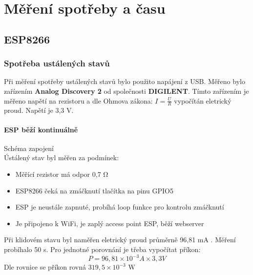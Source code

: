 \documentclass[a4paper, 12pt]{report}
\begin{document}
	\chapter{Měření spotřeby a času}
		\section{ESP8266}

			\subsection{Spotřeba ustálených stavů}
				Při měření spotřeby ustálených stavů bylo použito napájení z USB. Měřeno bylo zařízením \textbf{Analog Discovery 2} od společnosti \textbf{DIGILENT}. Tímto zařízením je měřeno napětí na rezistoru a dle Ohmova zákona: $I =\frac{U}{R}$ vypočítán eletrický proud. Napětí je 3,3 V.

				\subsubsection{ESP běží kontinuálně}
					Schéma zapojení  \\
					Ústálený stav byl měřen za podmínek:
					\begin{itemize}
						\item Měřící rezistor má odpor 0,7 \si{\ohm}
						\item ESP8266 čeká na zmáčknutí tlačítka na pinu GPIO5
						\item ESP je neustále zapnuté, probíhá loop funkce pro kontrolu zmáčknutí
						\item Je připojeno k WiFi, je zaplý access point ESP, běží webserver
					\end{itemize}
		 			Při klidovém stavu byl naměřen eletrický proud průměrně 96,81 \si{mA} . Měření probíhalo 50 \si{s}. Pro jednotné porovnání je třeba vypočítat příkon:
						$$P = 96,81 \times 10^{-3}\si{A} \times 3,3 \si{ V}$$
		 			Dle rovnice se příkon rovná $ 319,5 \times 10^{-3}$ \si{\watt}\\
\end{document}
